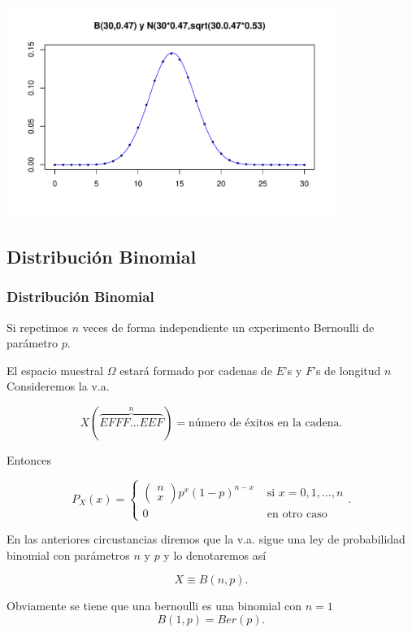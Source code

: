 \documentclass[handout]{beamer}\usepackage[]{graphicx}\usepackage[]{color}
\newenvironment{knitrout}{}{} %
\renewcommand{\emph}[1]{{\color{red}#1}}
\theoremstyle{plain}
\theoremstyle{definition}
\begin{document}
\begin{frame}[fragile]

\begin{knitrout}
\color{fgcolor}
\includegraphics[width=0.8\textwidth]{figure/unnamed-chunk-3-1} 

\end{knitrout}

\end{frame}

 \subsection{Distribución Binomial}
\begin{frame}

\frametitle{Distribución Binomial}

Si repetimos $n$ veces de forma independiente un experimento Bernoulli de parámetro $p$.

El espacio muestral $\Omega$ estará formado por cadenas de $E$'s y $F$'s de longitud $n$
Consideremos la v.a.

$$X(\overbrace{EFFF\ldots EEF}^{n})=\mbox{número de éxitos en la cadena}.$$

Entonces

 $$P_{X}(x)=\left\{
 \begin{array}{ll}
 \left(\begin{array}{ll} n\\
    x\end{array}\right) p^x (1-p)^{n-x} &\mbox{ si } x=0,1,\ldots,n\\
    0  & \mbox{ en otro caso}
  \end{array}\right..$$

\end{frame}

\begin{frame}

    En las anteriores circustancias diremos que la v.a. sigue una \emph{ley de probabilidad binomial con parámetros $n$ y $p$} y lo denotaremos así 
    
    $$X\equiv B(n,p).$$ 
    
    Obviamente se tiene que una bernoulli es una binomial con $n=1$
    $$B(1,p)=Ber(p).$$
\end{frame}
\end{document}
